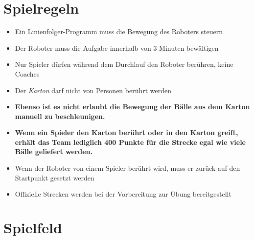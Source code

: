 \documentclass[a4paper,12pt]{article}
\begin{document}
\section{Spielregeln}
\begin{itemize}
	\item Ein Linienfolger-Programm muss die Bewegung des Roboters steuern
	\item Der Roboter muss die Aufgabe innerhalb von 3 Minuten bewältigen
	\item Nur Spieler dürfen während dem Durchlauf den Roboter berühren, keine Coaches
	\item Der \emph{Karton} darf nicht von Personen berührt werden
	\item \textbf{Ebenso ist es nicht erlaubt die Bewegung der Bälle aus dem Karton manuell
	zu beschleunigen.}
	\item \textbf{Wenn ein Spieler den Karton berührt oder in den Karton greift, erhält das Team lediglich
	400 Punkte für die Strecke egal wie viele Bälle geliefert werden.}
	\item Wenn der Roboter von einem Spieler berührt wird, muss er zurück auf den Startpunkt gesetzt werden
	\item Offizielle Strecken werden bei der Vorbereitung zur Übung bereitgestellt
\end{itemize}
\section{Spielfeld}
\end{document}
